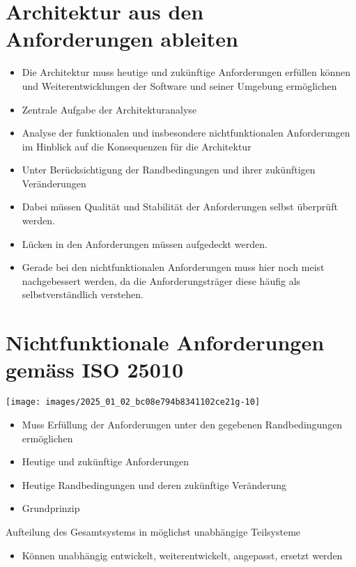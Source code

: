 \documentclass[10pt]{article}
\begin{document}
\section*{Architektur aus den Anforderungen ableiten}
\begin{itemize}
  \item Die Architektur muss heutige und zukünftige Anforderungen erfüllen können und Weiterentwicklungen der Software und seiner Umgebung ermöglichen
  \item Zentrale Aufgabe der Architekturanalyse
  \item Analyse der funktionalen und insbesondere nichtfunktionalen Anforderungen im Hinblick auf die Konsequenzen für die Architektur
  \item Unter Berücksichtigung der Randbedingungen und ihrer zukünftigen Veränderungen
  \item Dabei müssen Qualität und Stabilität der Anforderungen selbst überprüft werden.
  \item Lücken in den Anforderungen müssen aufgedeckt werden.
  \item Gerade bei den nichtfunktionalen Anforderungen muss hier noch meist nachgebessert werden, da die Anforderungsträger diese häufig als selbstverständlich verstehen.
\end{itemize}

\section*{Nichtfunktionale Anforderungen gemäss ISO 25010}
\begin{center}
\texttt{[image: images/2025\_01\_02\_bc08e794b8341102ce21g-10]}
\end{center}

\begin{itemize}
  \item Muss Erfüllung der Anforderungen unter den gegebenen Randbedingungen ermöglichen
  \item Heutige und zukünftige Anforderungen
  \item Heutige Randbedingungen und deren zukünftige Veränderung
  \item Grundprinzip
\end{itemize}

Aufteilung des Gesamtsystems in möglichst unabhängige Teilsysteme

\begin{itemize}
  \item Können unabhängig entwickelt, weiterentwickelt, angepasst, ersetzt werden
\end{itemize}
\end{document}
